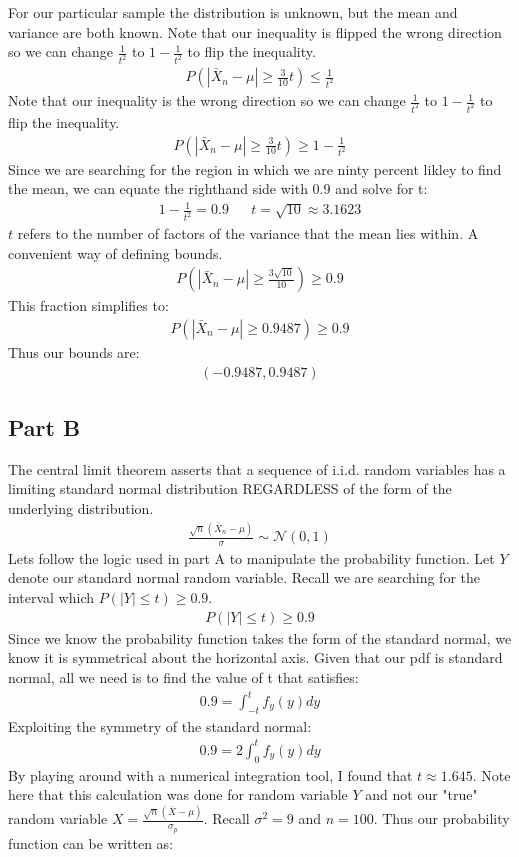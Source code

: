 \documentclass{article}
\begin{document}
For our particular sample the distribution is unknown, but the mean and variance are both known. Note that our inequality is flipped the wrong direction so we can change $\frac{1}{t^2}$ to $1-\frac{1}{t^2}$ to flip the inequality.
\begin{align*}
P(|\bar{X}_n-\mu| \geq \tfrac{3}{10}t) \leq \frac{1}{t^2}
\end{align*}
Note that our inequality is the wrong direction so we can change $\frac{1}{t^2}$ to $1-\frac{1}{t^2}$ to flip the inequality.
\begin{align*}
P(|\bar{X}_n-\mu| \geq \tfrac{3}{10}t) \geq 1-\frac{1}{t^2}
\end{align*}
Since we are searching for the region in which we are ninty percent likley to find the mean, we can equate the righthand side with 0.9 and solve for t:
\begin{align*}
1-\frac{1}{t^2} = 0.9 && t=\sqrt{10} \approx 3.1623
\end{align*}
$t$ refers to the number of factors of the variance that the mean lies within. A convenient way of defining bounds.
\begin{align*}
P(|\bar{X}_n-\mu| \geq \tfrac{3\sqrt{10}}{10}) \geq 0.9
\end{align*}
This fraction simplifies to:
\begin{align*}
P(|\bar{X}_n-\mu| \geq 0.9487) \geq 0.9
\end{align*}
Thus our bounds are:
\begin{align*}
\boxed{(-0.9487,0.9487)}
\end{align*}
\subsection*{Part B}
The central limit theorem asserts that a sequence of i.i.d. random variables has a limiting standard normal distribution REGARDLESS of the form of the underlying distribution.
\begin{align*}
\frac{\sqrt{n}(\bar{X}_n-\mu)}{\sigma} \sim \mathcal{N}(0,1)
\end{align*}
Lets follow the logic used in part A to manipulate the probability function. Let $Y$ denote our standard normal random variable. Recall we are searching for the interval which $P(|Y|\leq t) \geq 0.9$.
\begin{align*}
P(|Y|\leq t) \geq 0.9
\end{align*}
Since we know the probability function takes the form of the standard normal, we know it is symmetrical about the horizontal axis. Given that our pdf is standard normal, all we need is to find the value of t that satisfies:
\begin{align*}
0.9 = \int_{-t}^{t} f_y(y) dy
\end{align*}
Exploiting the symmetry of the standard normal:
\begin{align*}
0.9 = 2\int_{0}^{t} f_y(y) dy
\end{align*}
By playing around with a numerical integration tool, I found that $t \approx 1.645$. Note here that this calculation was done for random variable $Y$ and not our "true" random variable $X = \frac{\sqrt{n}(\bar{X}-\mu)}{\sigma_p}$. Recall $\sigma^2=9$ and $n=100$. Thus our probability function can be written as:
\end{document}
